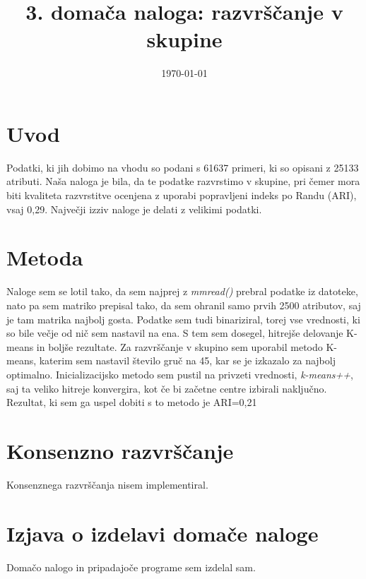 \documentclass[a4paper,11pt]{article}
\title{3. domača naloga: razvrščanje v skupine}
\date{\today}
\begin{document}
\maketitle

\section{Uvod}

Podatki, ki jih dobimo na vhodu so podani s 61637 primeri, ki so opisani z 25133 atributi. Naša naloga je bila, da te podatke razvrstimo v skupine, pri čemer mora biti kvaliteta razvrstitve ocenjena z uporabi popravljeni indeks po Randu (ARI), vsaj 0,29. Največji izziv naloge je delati z velikimi podatki.

\section{Metoda}

Naloge sem se lotil tako, da sem najprej z \textit{mmread()} prebral podatke iz datoteke, nato pa sem matriko prepisal tako, da sem ohranil samo prvih 2500 atributov, saj je tam matrika najbolj gosta. Podatke sem tudi binariziral, torej vse vrednosti, ki so bile večje od nič sem nastavil na ena. S tem sem dosegel, hitrejše delovanje K-means in boljše rezultate. Za razvrščanje v skupino sem uporabil metodo K-means, katerim sem nastavil število gruč na 45, kar se je izkazalo za najbolj optimalno. Inicializacijsko metodo sem pustil na privzeti vrednosti, \textit{k-means++}, saj ta veliko hitreje konvergira, kot če bi začetne centre izbirali naključno.
Rezultat, ki sem ga uspel dobiti s to metodo je ARI=0,21


\section{Konsenzno razvrščanje}

Konsenznega razvrščanja nisem implementiral.

\section{Izjava o izdelavi domače naloge}
Domačo nalogo in pripadajoče programe sem izdelal sam.
\end{document}
